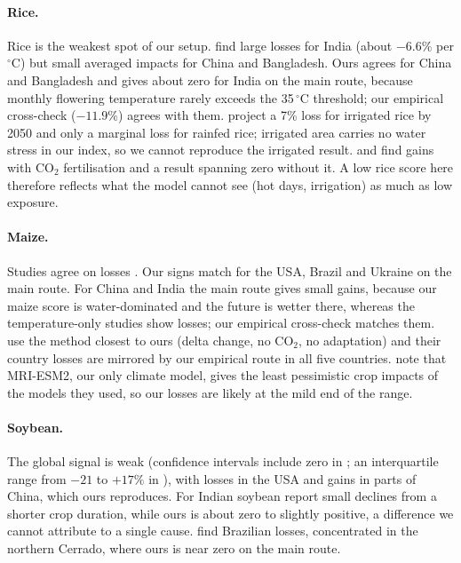 \paragraph{Rice.} Rice is the weakest spot of our setup. \citet{zhao2017} find large losses for India (about
$-6.6\%$ per $^\circ$C) but small averaged impacts for China and Bangladesh. Ours agrees for China and Bangladesh and
gives about zero for India on the main route, because monthly flowering temperature rarely exceeds the 35\,$^\circ$C
threshold; our empirical cross-check ($-11.9\%$) agrees with them. \citet{soora2013} project a 7\% loss for irrigated rice
by 2050 and only a marginal loss for rainfed rice; irrigated area carries no water stress in our index, so we cannot
reproduce the irrigated result. \citet{jagermeyr2021} and \citet{chandran2023} find gains with CO$_2$ fertilisation and
a result spanning zero without it. A low rice score here therefore reflects what the model cannot see (hot days,
irrigation) as much as low exposure.

\paragraph{Maize.} Studies agree on losses \citep{zhao2017,jagermeyr2021,tigchelaar2018,zilli2020}. Our signs match
for the USA, Brazil and Ukraine on the main route. For China and India the main route gives small gains, because our
maize score is water-dominated and the future is wetter there, whereas the temperature-only studies show losses; our
empirical cross-check matches them. \citet{tigchelaar2018} use the method closest to ours (delta change, no CO$_2$,
no adaptation) and their country losses are mirrored by our empirical route in all five countries.
\citet{jagermeyr2021} note that MRI-ESM2, our only climate model, gives the least pessimistic crop impacts of the
models they used, so our losses are likely at the mild end of the range.

\paragraph{Soybean.} The global signal is weak (confidence intervals include zero in \citealt{zhao2017}; an interquartile
range from $-21$ to $+17\%$ in \citealt{jagermeyr2021}), with losses in the USA and gains in parts of China, which ours
reproduces. For Indian soybean \citet{walikar2018} report small declines from a shorter crop duration, while ours is
about zero to slightly positive, a difference we cannot attribute to a single cause. \citet{zilli2020} find Brazilian
losses, concentrated in the northern Cerrado, where ours is near zero on the main route.

